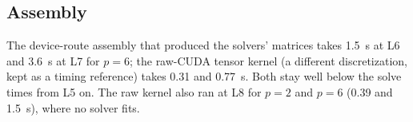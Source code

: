 \subsection{Assembly}

The device-route assembly that produced the solvers' matrices takes 1.5~s at L6 and 3.6~s at
L7 for $p=6$; the raw-CUDA tensor kernel (a different discretization, kept as a timing
reference) takes 0.31 and 0.77~s. Both stay well below the solve times from L5 on. The raw kernel
also ran at L8 for $p=2$ and $p=6$ (0.39 and 1.5~s), where no solver fits.
